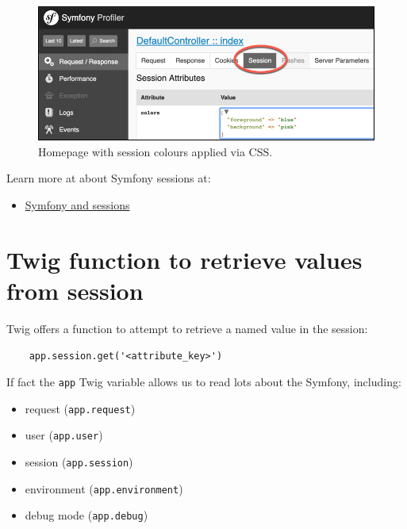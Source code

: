 \documentclass[a4paperpaper,openright]{book}
\providecommand{\tightlist}{%
  \setlength{\itemsep}{0pt}\setlength{\parskip}{0pt}}
\begin{document}
\begin{figure}
\centering
\includegraphics{./tex2pdf.-51e064f4751cea0e/b55c386213380dcd9a550b90e2383b0bc3e55ffa.png}
\caption{Homepage with session colours applied via CSS.
\label{session_profiler}}
\end{figure}

Learn more at about Symfony sessions at:

\begin{itemize}
\tightlist
\item
  \href{http://symfony.com/doc/current/components/http_foundation/sessions.html}{Symfony
  and sessions}
\end{itemize}

\hypertarget{twig-function-to-retrieve-values-from-session}{%
\section{Twig function to retrieve values from
session}\label{twig-function-to-retrieve-values-from-session}}

Twig offers a function to attempt to retrieve a named value in the
session:

\begin{verbatim}
    app.session.get('<attribute_key>')
\end{verbatim}

If fact the \texttt{app} Twig variable allows us to read lots about the
Symfony, including:

\begin{itemize}
\item
  request (\texttt{app.request})
\item
  user (\texttt{app.user})
\item
  session (\texttt{app.session})
\item
  environment (\texttt{app.environment})
\item
  debug mode (\texttt{app.debug})
\end{itemize}
\end{document}
